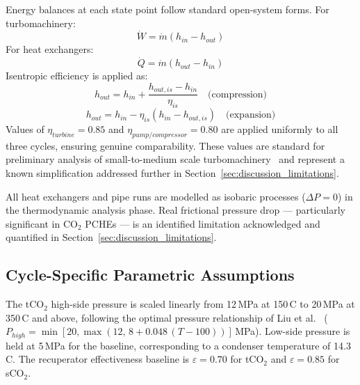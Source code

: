 \documentclass[12pt,a4paper]{report}
\begin{document}
Energy balances at each state point follow standard open-system forms. For
turbomachinery:
\begin{equation}
\dot{W} = \dot{m}(h_{in} - h_{out})
\label{eq:turbomachinery}
\end{equation}
For heat exchangers:
\begin{equation}
\dot{Q} = \dot{m}(h_{out} - h_{in})
\label{eq:hx}
\end{equation}
Isentropic efficiency is applied as:
\begin{equation}
h_{out} = h_{in} + \frac{h_{out,is} - h_{in}}{\eta_{is}}
\quad\text{(compression)}
\label{eq:compression}
\end{equation}
\begin{equation}
h_{out} = h_{in} - \eta_{is}(h_{in} - h_{out,is})
\quad\text{(expansion)}
\label{eq:expansion}
\end{equation}
Values of $\eta_{turbine} = 0.85$ and $\eta_{pump/compressor} = 0.80$ are
applied uniformly to all three cycles, ensuring genuine comparability. These
values are standard for preliminary analysis of small-to-medium scale
turbomachinery~\cite{Macchi2017} and represent a known simplification
addressed further in Section~\ref{sec:discussion_limitations}.

All heat exchangers and pipe runs are modelled as isobaric processes
($\Delta P = 0$) in the thermodynamic analysis phase. Real frictional pressure
drop --- particularly significant in CO$_2$ PCHEs --- is an identified
limitation acknowledged and quantified in Section~\ref{sec:discussion_limitations}.

\subsection{Cycle-Specific Parametric Assumptions}

The tCO$_2$ high-side pressure is scaled linearly from 12\,MPa at
150\,\textdegree C to 20\,MPa at 350\,\textdegree C and above, following
the optimal pressure relationship of Liu et al.~\cite{Liu2024}
($P_{high} = \min[20, \max(12,\, 8 + 0.048\,(T-100))]$\,MPa). Low-side
pressure is held at 5\,MPa for the baseline, corresponding to a condenser
temperature of 14.3\,\textdegree C. The recuperator effectiveness baseline is
$\varepsilon = 0.70$ for tCO$_2$ and $\varepsilon = 0.85$ for sCO$_2$.
\end{document}
